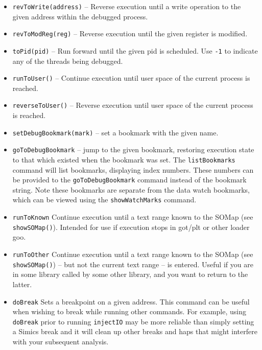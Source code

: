 \documentclass[titlepage]{article}
\begin{document}
\begin{itemize}
\item {\tt revToWrite(address)} – Reverse execution until a write operation to the given address within the debugged process.

\item {\tt revToModReg(reg)} – Reverse execution until the given register is modified.


\item {\tt toPid(pid)} -- Run forward until the given pid is scheduled.  Use {\tt -1} to indicate any of the threads being debugged.

\item {\tt runToUser()} – Continue execution until user space of the current process is reached.

\item {\tt reverseToUser()} – Reverse execution until user space of the current process is reached.

\item {\tt setDebugBookmark(mark)} – set a bookmark with the given name.

\item {\tt goToDebugBookmark} – jump to the given bookmark, restoring execution state to that which existed when the bookmark was set.  The
{\tt listBookmarks} command will list bookmarks, displaying  index numbers.  These numbers can be provided to the {\tt goToDebugBookmark} command instead
of the bookmark string.  Note these bookmarks are separate from the data watch bookmarks, which can be viewed using the {\tt showWatchMarks} command.

\item {\tt runToKnown} Continue execution until a text range known to the SOMap (see {\tt showSOMap()}).  Intended for use if execution stops in got/plt 
or other loader goo.

\item {\tt runToOther} Continue execution until a text range known to the SOMap (see {\tt showSOMap()}) -- but not the current text range -- is entered.
Useful if you are in some library called by some other library, and you want to return to the latter.

\item {\tt doBreak} Sets a breakpoint on a given address.  This command can be useful when wishing to break while running other commands.  For example,
using {\tt doBreak} prior to running {\tt injectIO} may be more reliable than simply setting a Simics break and it will clean up other breaks and haps that 
might interfere with your subsequent analysis.

\end{itemize}
\end{document}
